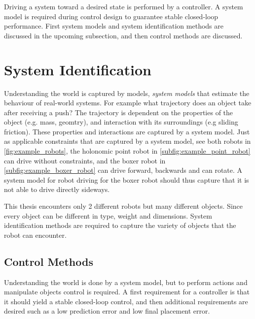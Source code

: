Driving a system toward a desired state is performed by a controller. A system model is required during control design to guarantee stable closed-loop performance. First system models and system identification methods are discussed in the upcoming subsection, and then control methods are discussed.\bs
{}

\section{System Identification}%
\label{sec:sys_iden}
Understanding the world is captured by models, \textit{system models} that estimate the behaviour of real-world systems. For example what trajectory does an object take after receiving a push? The trajectory is dependent on the properties of the object (e.g. mass, geomtry), and interaction with its surroundings (e.g sliding friction). These properties and interactions are captured by a system model. Just as applicable constraints that are captured by a system model, see both robots in \cref{fig:example_robots}, the holonomic point robot in \cref{subfig:example_point_robot} can drive without constraints, and the boxer robot in \cref{subfig:example_boxer_robot} can drive forward, backwards and can rotate. A system model for robot driving for the boxer robot should thus capture that it is not able to drive directly sideways.\bs
{}

This thesis encounters only 2 different robots but many different objects. Since every object can be different in type, weight and dimensions. System identification methods are required to capture the variety of objects that the robot can encounter.\bs


\subsection{Control Methods}%
\label{subsec:control_methods}
Understanding the world is done by a system model, but to perform actions and manipulate objects control is required. A first requirement for a controller is that it should yield a stable closed-loop control, and then additional requirements are desired such as a low prediction error and low final placement error.

